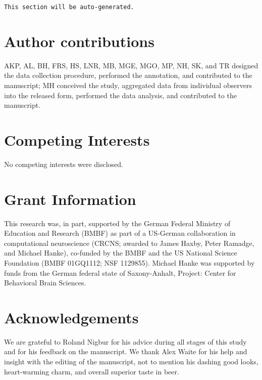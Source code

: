\documentclass[10pt,a4paper,twocolumn]{article}
\begin{document}
\texttt{This section will be auto-generated.}


\section*{Author contributions}
AKP, AL, BH, FRS, HS, LNR, MB, MGE, MGO, MP, NH, SK, and TR designed the data
collection procedure, performed the annotation, and contributed to the
manuscript; MH conceived the study, aggregated data from individual observers
into the released form, performed the data analysis, and contributed to the
manuscript.

\section*{Competing Interests}
No competing interests were disclosed.

\section*{Grant Information}

This research was, in part, supported by the German Federal Ministry of
Education and Research (BMBF) as part of a US-German collaboration in
computational neuroscience (CRCNS; awarded to James Haxby, Peter Ramadge, and
Michael Hanke), co-funded by the BMBF and the US National Science Foundation
(BMBF 01GQ1112; NSF 1129855). Michael Hanke was supported by funds from the
German federal state of Saxony-Anhalt, Project: Center for Behavioral Brain
Sciences.

\section*{Acknowledgements}

We are grateful to Roland Nigbur for his advice during all stages of this
study and for his feedback on the manuscript. We thank Alex Waite for his help
and insight with the editing of the manuscript, not to mention his dashing good
looks, heart-warming charm, and overall superior taste in beer.

{\small
}
\end{document}
